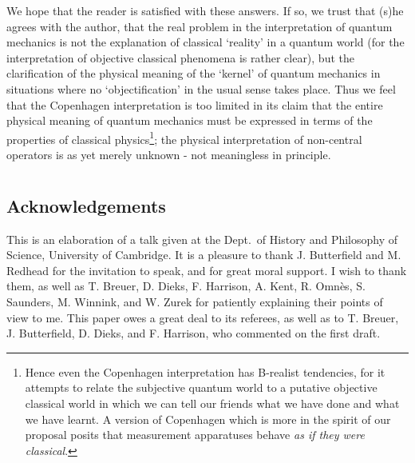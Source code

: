 \documentclass[12pt,titlepage]{article}
\newcommand{\fn}{\footnote}
\begin{document}
We hope that the reader is satisfied with these answers. If so, we trust that
(s)he agrees with the
author, that the real problem in the interpretation of quantum mechanics is not
the explanation of
classical `reality' in a quantum world (for the interpretation of objective
classical phenomena is
rather clear), but the clarification of the physical meaning of the `kernel' of
quantum mechanics in
situations where no `objectification' in the usual sense takes place.
Thus we feel that the Copenhagen interpretation is too limited in its claim
that the entire physical
 meaning of quantum mechanics must be expressed
in terms of  the properties of classical physics\fn{Hence even the Copenhagen
interpretation has B-realist tendencies, for it attempts to relate the
subjective quantum world to a
putative objective classical world in which we can tell our friends what we
have done and what we
have learnt. A version of Copenhagen which is more in the spirit of our
proposal posits that
measurement apparatuses behave {\em as if they were classical}.}; the physical
interpretation of
non-central operators is as yet merely unknown - not meaningless in principle.

\section*{\mbox{}}
\subsection*{Acknowledgements}
This is an elaboration of a talk given at the Dept.\ of History and Philosophy
of Science,
University of Cambridge. It is a pleasure to thank J. Butterfield and M.
Redhead for the invitation
to speak, and for great moral support. I wish to thank them, as well as T.
Breuer, D. Dieks, F.
Harrison,  A. Kent, R. Omn\`{e}s, S. Saunders, M. Winnink,  and W. Zurek for
patiently explaining
their points of view to me. This paper owes a great deal to its referees, as
well as to
 T. Breuer, J. Butterfield, D. Dieks, and F.
Harrison, who commented on the first draft.
%
\newpage
\end{document}
